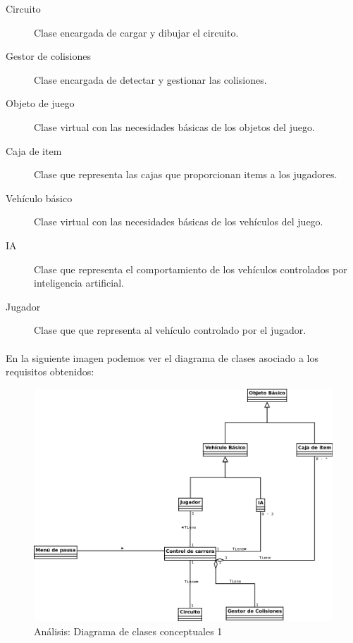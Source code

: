 \begin{description}
    \item [Circuito] Clase encargada de cargar y dibujar el circuito.
    \item [Gestor de colisiones] Clase encargada de detectar y gestionar las colisiones.
    
    \item [Objeto de juego] Clase virtual con las necesidades básicas de los objetos del juego.
    \item [Caja de item] Clase que representa las cajas que proporcionan items a los jugadores.
    \item [Vehículo básico] Clase virtual con las necesidades básicas de los vehículos del juego.
    \item [IA] Clase que representa el comportamiento de los vehículos controlados por inteligencia artificial.
    \item [Jugador] Clase que que representa al vehículo controlado por el jugador.
\end{description}

\paragraph{}
En la siguiente imagen podemos ver el diagrama de clases asociado a los requisitos obtenidos:

\begin{figure}[H]
  \label{diagrama_clases_conceptuales}
  \begin{center}
    \includegraphics[scale=0.4]{imagenes/analisis/diagrama_clases_conceptuales2.png}
  \end{center}
  \caption{Análisis: Diagrama de clases conceptuales 1}
\end{figure}

